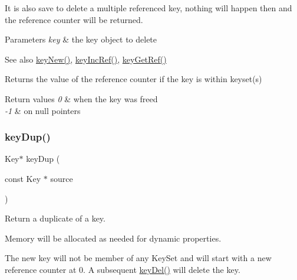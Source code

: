 It is also save to delete a multiple referenced key, nothing will happen then and the reference counter will be returned.


\begin{DoxyParams}{Parameters}
{\em key} & the key object to delete \\
\hline
\end{DoxyParams}
\begin{DoxySeeAlso}{See also}
\mbox{\hyperlink{group__key_gad23c65b44bf48d773759e1f9a4d43b89}{key\+New()}}, \mbox{\hyperlink{group__key_ga6970a6f254d67af7e39f8e469bb162f1}{key\+Inc\+Ref()}}, \mbox{\hyperlink{group__key_ga4aabc4272506dd63161db2bbb42de8ae}{key\+Get\+Ref()}} 
\end{DoxySeeAlso}
\begin{DoxyReturn}{Returns}
the value of the reference counter if the key is within keyset(s) 
\end{DoxyReturn}

\begin{DoxyRetVals}{Return values}
{\em 0} & when the key was freed \\
\hline
{\em -\/1} & on null pointers \\
\hline
\end{DoxyRetVals}
\mbox{\label{group__key_gae6ec6a60cc4b8c1463fa08623d056ce3}} 
\subsubsection{\texorpdfstring{keyDup()}{keyDup()}}
{\footnotesize\ttfamily Key$\ast$ key\+Dup (\begin{DoxyParamCaption}\item[{const Key $\ast$}]{source }\end{DoxyParamCaption})}



Return a duplicate of a key. 

Memory will be allocated as needed for dynamic properties.

The new key will not be member of any Key\+Set and will start with a new reference counter at 0. A subsequent \mbox{\hyperlink{group__key_ga3df95bbc2494e3e6703ece5639be5bb1}{key\+Del()}} will delete the key.


\begin{DoxyCode}{0}
\DoxyCodeLine{\{}
\DoxyCodeLine{        \textcolor{comment}{// work with duplicate}}
\DoxyCodeLine{        \textcolor{comment}{// everything related to dup is freed}}
\DoxyCodeLine{        \textcolor{comment}{// and source is unchanged}}
\DoxyCodeLine{\}}
\end{DoxyCode}


